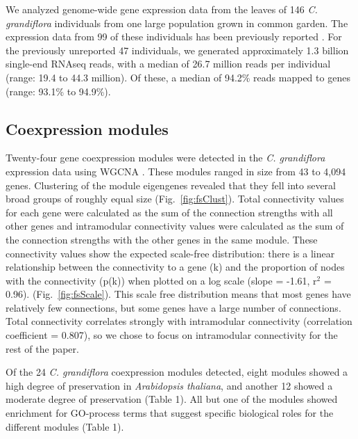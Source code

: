 We analyzed genome-wide gene expression data from the leaves of 146 \textit{C. grandiflora} individuals from one large population grown in common garden. The expression data from 99 of these individuals has been previously reported \citep{Josephs2015-nx}. For the previously unreported 47 individuals, we generated approximately 1.3 billion single-end RNAseq reads, with a median of 26.7 million reads per individual (range: 19.4 to 44.3 million). Of these, a median of 94.2\% reads mapped to genes (range: 93.1\% to 94.9\%).

\subsection{Coexpression modules}
Twenty-four gene coexpression modules were detected in the \textit{C. grandiflora} expression data using WGCNA \citep{langfelder2008}. These modules ranged in size from 43 to 4,094 genes. Clustering of the module eigengenes revealed that they fell into several broad groups of roughly equal size (Fig.~\ref{fig:fsClust}). Total connectivity values for each gene were calculated as the sum of the connection strengths with all other genes and intramodular connectivity values were calculated as the sum of the connection strengths with the other genes in the same module. These connectivity values show the expected scale-free distribution: there is a linear relationship between the connectivity to a gene (k) and the proportion of nodes with the connectivity (p(k)) when plotted on a log scale (slope = -1.61, r$^{2}$ = 0.96). (Fig.~\ref{fig:fsScale}). This scale free distribution means that most genes have relatively few connections, but some genes have a large number of connections. Total connectivity correlates strongly with intramodular connectivity (correlation coefficient = 0.807), so we chose to focus on intramodular connectivity for the rest of the paper.

Of the 24 \textit{C. grandiflora} coexpression modules detected, eight modules showed a high degree of preservation in \textit{Arabidopsis thaliana}, and another 12 showed a moderate degree of preservation (Table 1). All but one of the modules showed enrichment for GO-process terms that suggest specific biological roles for the different modules (Table 1).

